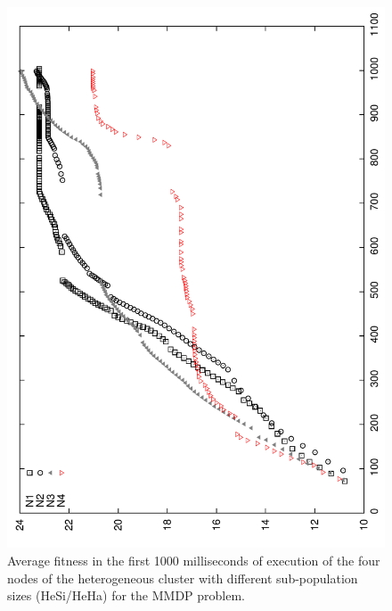 \begin{figure}
\centering
 \includegraphics[angle=-90,scale =0.4] {gfx/adaptiveresults/generationsMMDPheterosize.pdf}
\caption{Average fitness in the first 1000 milliseconds of execution
  of the four nodes of the heterogeneous cluster with different
  sub-population sizes (HeSi/HeHa) for the MMDP problem.} %
\label{fig:hesiheha}
\end{figure}

